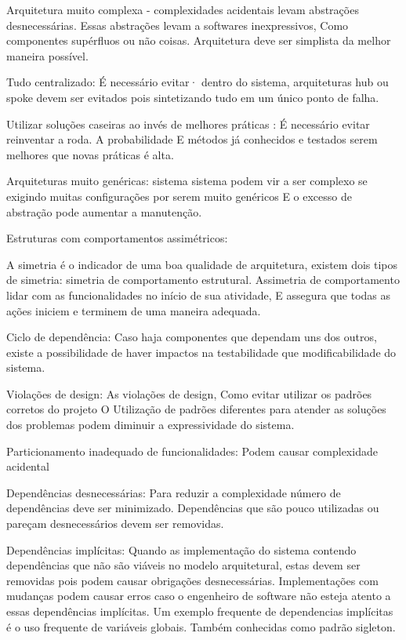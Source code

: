 Arquitetura muito complexa - complexidades acidentais levam abstrações desnecessárias. Essas abstrações levam a softwares inexpressivos, Como componentes supérfluos ou não coisas. Arquitetura deve ser simplista da melhor maneira possível.

Tudo centralizado: É necessário evitar· dentro do sistema, arquiteturas hub ou spoke devem ser evitados pois sintetizando tudo em um único ponto de falha.

Utilizar soluções caseiras ao invés de melhores práticas
: É necessário evitar reinventar a roda. A probabilidade E métodos já conhecidos e testados serem melhores que novas práticas é alta.

Arquiteturas muito genéricas: sistema sistema podem vir a ser complexo se exigindo muitas configurações por serem muito genéricos E o excesso de abstração pode aumentar a manutenção.


Estruturas com comportamentos assimétricos:

A simetria é o indicador de uma boa qualidade de arquitetura, existem dois tipos de simetria: simetria de comportamento estrutural. Assimetria de comportamento lidar com as funcionalidades no início de sua atividade, E assegura que todas as ações iniciem e terminem de uma maneira adequada. 


Ciclo de dependência:
Caso haja componentes que dependam uns dos outros, existe a possibilidade de haver impactos na testabilidade que modificabilidade do sistema.

Violações de design:
As violações de design, Como evitar utilizar os padrões corretos do projeto O Utilização de padrões diferentes para atender as soluções dos problemas podem diminuir a expressividade do sistema.

Particionamento inadequado de funcionalidades:
Podem causar complexidade acidental

Dependências desnecessárias:
Para reduzir a complexidade número de dependências deve ser minimizado. Dependências que são pouco utilizadas ou pareçam desnecessários devem ser removidas.

Dependências implícitas:
Quando as implementação do sistema contendo dependências que não são viáveis no modelo arquitetural, estas devem ser removidas pois podem causar obrigações desnecessárias. Implementações com mudanças podem causar erros caso o engenheiro de software não esteja atento a essas dependências implícitas. Um exemplo frequente de dependencias implícitas é o  uso frequente de variáveis globais. Também conhecidas como padrão sigleton.

